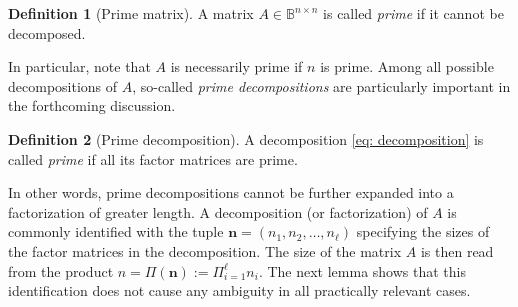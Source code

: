 \documentclass{article}
\numberwithin{equation}{section}
\theoremstyle{definition}
\newtheorem{definition}{Definition}[section]
\begin{document}
\begin{definition}[Prime matrix]
A matrix $A \in \mathbb{B}^{n \times n}$ is called \emph{prime} if it cannot be decomposed.    
\end{definition}

In particular, note that $A$ is necessarily prime if $n$ is prime. Among all possible decompositions of $A$, so-called \emph{prime decompositions} are particularly important in the forthcoming discussion.

\begin{definition}[Prime decomposition]
A decomposition \eqref{eq: decomposition} is called \emph{prime} if all its factor matrices are prime. 
\end{definition}

In other words, prime decompositions cannot be further expanded into a factorization of greater length. A decomposition (or factorization) of $A$ is commonly identified with the tuple $\bm{n}=(n_1,n_2,\dots,n_\ell)$ specifying the sizes of the factor matrices in the decomposition. The size of the matrix $A$ is then read from the product $n=\Pi(\bm{n}):=\Pi_{i=1}^\ell n_i$. The next lemma shows that this identification does not cause any ambiguity in all practically relevant cases.
\end{document}
